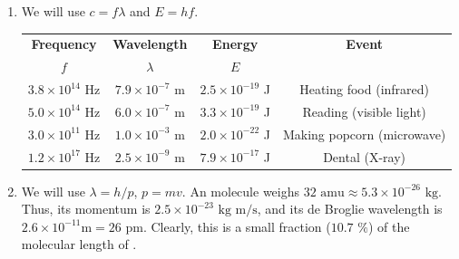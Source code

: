 \documentclass[10pt]{article}
\begin{document}
\begin{enumerate}
                \item We will use $c = f\lambda$ and $E = hf$.
                        \begin{center}
                        \begin{tabular}{| c | c | c | c |}
                        \hline
                        \textbf{Frequency}      &       \textbf{Wavelength}     &       \textbf{Energy}         &       \textbf{Event}\\
                        $f$                     &       $\lambda$               &       $E$                     &               \\\hline
                        $3.8 \times 10^{14}$ Hz & $7.9 \times 10^{-7}$ m        & $2.5 \times 10^{-19}$ J       &       Heating food (infrared)\\
                        $5.0 \times 10^{14}$ Hz & $6.0 \times 10^{-7}$ m        & $3.3 \times 10^{-19}$ J       &       Reading (visible light)\\
                        $3.0 \times 10^{11}$ Hz & $1.0 \times 10^{-3}$ m        & $2.0 \times 10^{-22}$ J       &       Making popcorn (microwave)\\
                        $1.2 \times 10^{17}$ Hz & $2.5 \times 10^{-9}$ m        & $7.9 \times 10^{-17}$ J       &       Dental (X-ray)\\\hline
                        \end{tabular}
                        \end{center}

                \item We will use $\lambda = h/p$, $p = mv$.
                An  molecule weighs $32 \text{ amu} \approx 5.3 \times 10^{-26} \text{ kg}$. Thus, its momentum is $2.5 \times 10^{-23}
                \text{ kg m/s}$, and its de Broglie wavelength is $2.6 \times 10^{-11} \text{m} = 26 \text{ pm}$. Clearly, this is
                a small fraction ($10.7 \text{ \%}$) of the molecular length of .


\end{enumerate}
\end{document}
